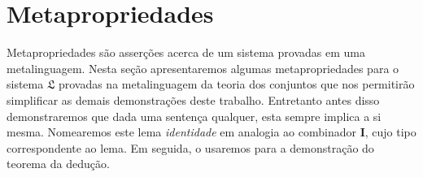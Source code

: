 \section{Metapropriedades}
    Metapropriedades são asserções acerca de um sistema provadas em uma metalinguagem.
    Nesta seção apresentaremos algumas metapropriedades para o sistema $\mathfrak{L}$ provadas na metalinguagem da teoria dos conjuntos que nos permitirão simplificar as demais demonstrações deste trabalho.
    Entretanto antes disso demonstraremos que dada uma sentença qualquer, esta sempre implica a si mesma.
    Nomearemos este lema \emph{identidade} em analogia ao combinador $\mathbf{I}$, cujo tipo correspondente ao lema.
    Em seguida, o usaremos para a demonstração do teorema da dedução.

    \vspace{\baselineskip}
